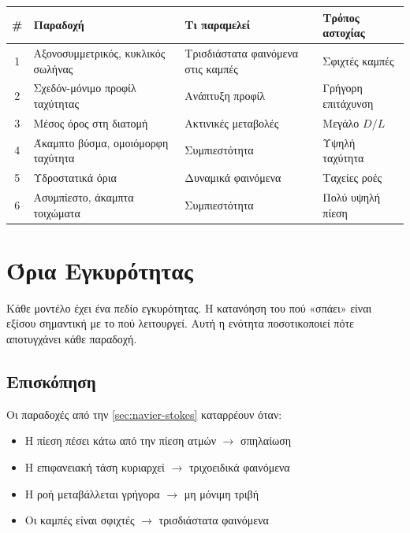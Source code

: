 \documentclass[11pt]{article}
\begin{document}
\begin{center}
\renewcommand{\arraystretch}{1.3}
\begin{tabular}{clll}
\toprule
\# & Παραδοχή & Τι παραμελεί & Τρόπος αστοχίας \\
\midrule
1 & Αξονοσυμμετρικός, κυκλικός σωλήνας & Τρισδιάστατα φαινόμενα στις καμπές & Σφιχτές καμπές \\
2 & Σχεδόν-μόνιμο προφίλ ταχύτητας & Ανάπτυξη προφίλ & Γρήγορη επιτάχυνση \\
3 & Μέσος όρος στη διατομή & Ακτινικές μεταβολές & Μεγάλο $D/L$ \\
4 & Άκαμπτο βύσμα, ομοιόμορφη ταχύτητα & Συμπιεστότητα & Υψηλή ταχύτητα \\
5 & Υδροστατικά όρια & Δυναμικά φαινόμενα & Ταχείες ροές \\
6 & Ασυμπίεστο, άκαμπτα τοιχώματα & Συμπιεστότητα & Πολύ υψηλή πίεση \\
\bottomrule
\end{tabular}
\end{center}

\section{Όρια Εγκυρότητας}
\label{sec:validity}

Κάθε μοντέλο έχει ένα πεδίο εγκυρότητας. Η κατανόηση του πού «σπάει» είναι εξίσου σημαντική με το πού λειτουργεί. Αυτή η ενότητα ποσοτικοποιεί πότε αποτυγχάνει κάθε παραδοχή.

\subsection{Επισκόπηση}

Οι παραδοχές από την \cref{sec:navier-stokes} καταρρέουν όταν:
\begin{itemize}[nosep,leftmargin=2em]
  \item Η πίεση πέσει κάτω από την πίεση ατμών $\to$ σπηλαίωση
  \item Η επιφανειακή τάση κυριαρχεί $\to$ τριχοειδικά φαινόμενα
  \item Η ροή μεταβάλλεται γρήγορα $\to$ μη μόνιμη τριβή
  \item Οι καμπές είναι σφιχτές $\to$ τρισδιάστατα φαινόμενα
\end{itemize}
\end{document}
